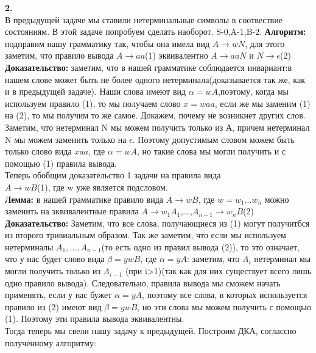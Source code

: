 \documentclass[a4paper,12pt]{article}
\begin{document}
\textbf{2.}\\
В предыдущей задаче мы ставили нетерминальные символы в соотвествие состояниям. В этой задаче попробуем сделать наоборот. S-0,A-1,B-2. 
\textbf{Алгоритм:} подправим нашу грамматику так, чтобы она имела вид $A\rightarrow wN$, для этого заметим, что правило вывода $A\rightarrow aa$(1) эквивалентно $A\rightarrow aaN$ и $N \rightarrow \epsilon$(2)\\
\textbf{Доказательство:} заметим, что в нашей грамматике соблюдается инвариант:в нашем слове может быть не более одного нетерминала(доказывается так же, как и в предыдущей задаче). Наши слова имеют вид $\alpha=wA$,поэтому, когда мы используем правило (1), то мы получаем слово $x=waa$, если же мы заменим (1) на (2), то мы получим то же самое. Докажем, почему не возникнет других слов. Заметим, что нетерминал N мы можем получить только из А, причем нетерминал N мы можем заменить только на $\epsilon$. Поэтому допустимым словом можем быть только слово вида $xaa$, где $\alpha=wA$, но такие слова мы могли получить и с помощью (1) правила вывода. \\
Теперь обобщим доказательство 1 задачи на правила вида\\
$A\rightarrow wB$(1), где w уже является подсловом.\\
\textbf{Лемма:} в нашей грамматике правило вида $A\rightarrow wB$, где $w=w_1...w_n$ можно заменить на эквивалентные правила $A\rightarrow w_1A_1$,...,$A_{n-1}\rightarrow w_nB$(2)\\
\textbf{Доказательство:} Заметим, что все слова, получающиеся из (1) могут получитбся из второго тривиальным образом. Так же заметим, что если мы используем нетерминалы $A_1,...,A_{n-1}$(то есть одно из правил вывода (2)), то это означает, что у нас будет слово вида $\beta=ywB$, где $\alpha=yA$: заметим, что $A_i$ нетерминал мы могли получить только из $A_{i-1}$ (при i>1)(так как для них существует всего лишь одно правило вывода). Следовательно, правила вывода мы сможем начать применять, если у нас бужет $\alpha=yA$, поэтому все слова,  в которых используется правило из (2) имеют вид $\beta=ywB$, но эти слова мы можем получить с помощью (1). Поэтому эти правила вывода эквивалентны.\\
Тогда теперь мы свели нашу задачу к предыдущей. Построим ДКА, соглассно полученному алгоритму:\\
\end{document}
